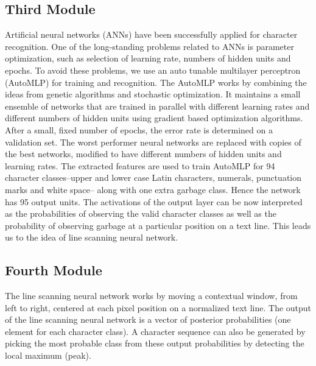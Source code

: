 \subsection{Third Module}
Artiﬁcial neural networks (ANNs) have been successfully applied for character recognition. One of the long-standing problems related to ANNs is parameter optimization, such as selection of learning rate, numbers of hidden units and epochs. To avoid these problems, we use an auto tunable multilayer perceptron (AutoMLP)  for training and recognition. The AutoMLP works by combining the ideas from genetic algorithms and stochastic optimization. It maintains a small ensemble of networks that are trained in parallel with different learning rates and different numbers of hidden units using gradient based optimization algorithms. After a small, ﬁxed number of epochs, the error rate is determined on a validation set. The worst performer neural networks are replaced with copies of the best networks, modiﬁed to have different numbers of hidden units and learning rates. The extracted features are used to train AutoMLP for 94 character classes–upper and lower case Latin characters, numerals, punctuation marks and white space– along with one extra garbage class. Hence the network has 95 output units. The activations of the output layer can be now interpreted as the probabilities of observing the valid character classes as well as the probability of observing garbage at a particular position on a text line. This leads us to the idea of line scanning neural network.\\

\subsection{Fourth Module}
The line scanning neural network works by moving a contextual window, from left to right, centered at each pixel position on a normalized text line. The output of the line scanning neural network is a vector of posterior probabilities (one element for each character class). A character sequence can also be generated by picking the most probable class from these output probabilities by detecting the local maximum (peak).\\

